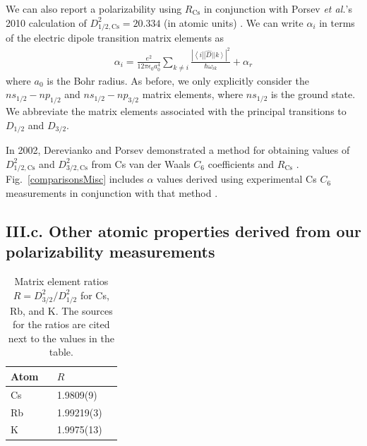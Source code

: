 \documentclass[twocolumn,prl,showpacs,superscriptaddress]{revtex4-1}   %
\newcommand{\sspace}{$\enspace$}
\newcommand{\brakett}[3]{\left.\left\langle #1 \right|\right|#2\left|\left| #3 \right\rangle\right.}
\newcommand{\figref}[1]{Fig.~\ref{#1}}
\newcommand{\rcs}{R_{\mathrm{Cs}}}
\newcommand{\etal}{\textit{et al.}}
\begin{document}
We can also report a polarizability using $\rcs$ \cite{Rafac1998} in conjunction with Porsev \etal's 2010 calculation of $D_{1/2,\mathrm{Cs}}^2 = 20.334$ (in atomic units) \cite{Porsev2010}.
We can write $\alpha_i$ in terms of the electric dipole transition matrix elements as
\begin{align}
	\alpha_i = \frac{e^2}{12 \pi \epsilon_0 a_0^4} \sum_{k\neq i}	
	\frac{\left|\brakett{i}{\hat{D}}{k}\right|^2}{\hbar\omega_{ik}}	
	+ \alpha_r
	\label{polFromMatrixElements}
\end{align}
where $a_0$ is the Bohr radius. 
As before, we only explicitly consider the $ns_{1/2}-np_{1/2}$ and $ns_{1/2}-np_{3/2}$ matrix elements, 
where $ns_{1/2}$ is the ground state.
We abbreviate the matrix elements associated with the principal transitions to $D_{1/2}$ and $D_{3/2}$.

In 2002, Derevianko and Porsev demonstrated a method for obtaining values of $D_{1/2,\mathrm{Cs}}^2$ and $D_{3/2,\mathrm{Cs}}^2$ from Cs van der Waals $C_6$ coefficients \cite{Derevianko2001} and $\rcs$ \cite{Rafac1998}. \figref{comparisonsMisc} includes $\alpha$ values derived using experimental Cs $C_6$ measurements in conjunction with that method \cite{Leo2000,Chin2004}.

\subsection{III.c. Other atomic properties derived from our polarizability measurements}

\begingroup
\begin{table}
\caption{\label{tableR}Matrix element ratios $R = D_{3/2}^2/D_{1/2}^2$ for Cs, Rb, and K. The sources for the ratios are cited next to the values in the table.}
\begin{center}
\begin{tabular}{lll}
\hline\hline
Atom \sspace & $R$ \\
\hline
Cs & 1.9809(9) & \cite{Rafac1998} \\
Rb & 1.99219(3) & \cite{Leonard2015} \\
K  & 1.9975(13) & \cite{Trubko2015} \\
\hline\hline
\end{tabular}
\end{center}
\end{table}
\endgroup
\end{document}
